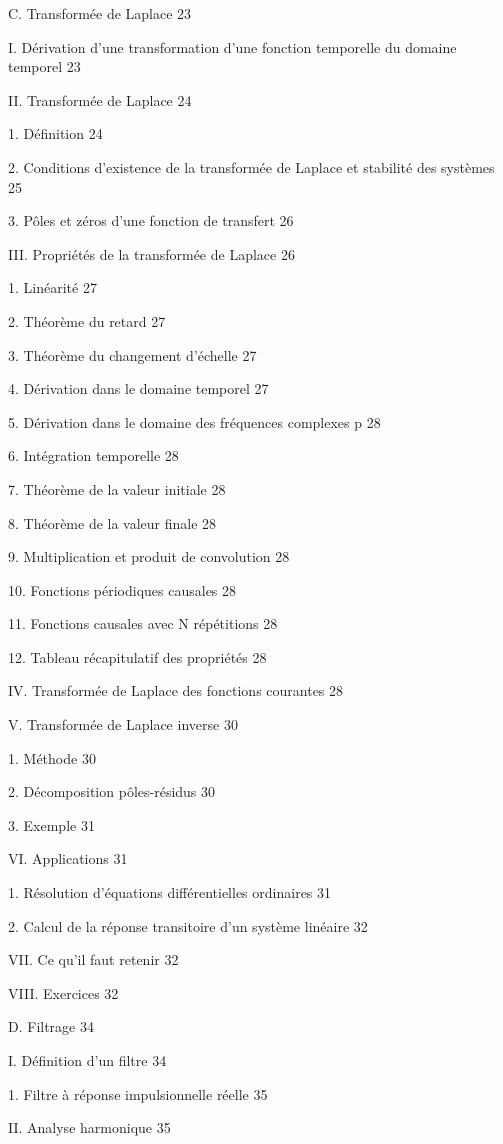 \documentclass[]{article}
\begin{document}
C. Transformée de Laplace 23

I. Dérivation d'une transformation d'une fonction temporelle du domaine
temporel 23

II. Transformée de Laplace 24

1. Définition 24

2. Conditions d'existence de la transformée de Laplace et stabilité des
systèmes 25

3. Pôles et zéros d'une fonction de transfert 26

III. Propriétés de la transformée de Laplace 26

1. Linéarité 27

2. Théorème du retard 27

3. Théorème du changement d'échelle 27

4. Dérivation dans le domaine temporel 27

5. Dérivation dans le domaine des fréquences complexes p 28

6. Intégration temporelle 28

7. Théorème de la valeur initiale 28

8. Théorème de la valeur finale 28

9. Multiplication et produit de convolution 28

10. Fonctions périodiques causales 28

11. Fonctions causales avec N répétitions 28

12. Tableau récapitulatif des propriétés 28

IV. Transformée de Laplace des fonctions courantes 28

V. Transformée de Laplace inverse 30

1. Méthode 30

2. Décomposition pôles-résidus 30

3. Exemple 31

VI. Applications 31

1. Résolution d'équations différentielles ordinaires 31

2. Calcul de la réponse transitoire d'un système linéaire 32

VII. Ce qu'il faut retenir 32

VIII. Exercices 32

D. Filtrage 34

I. Définition d'un filtre 34

1. Filtre à réponse impulsionnelle réelle 35

II. Analyse harmonique 35
\end{document}
